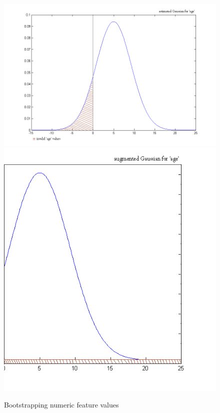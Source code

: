 \begin{landscape}
\begin{figure}[h]
\includegraphics[scale=0.55]{img/AgeRegress.png} \includegraphics[scale=0.55]{img/AgeRegress2.png} 
\caption{Bootstrapping numeric feature values}
\end{figure}
\end{landscape}




